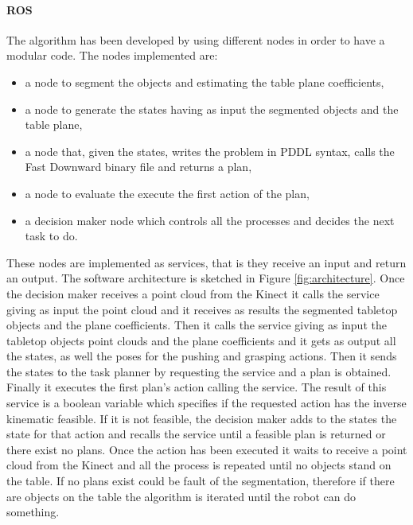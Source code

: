 \paragraph{ROS}
The algorithm has been developed by using different nodes in order to have a modular code. 
The nodes implemented are:
\begin{itemize}
\item a node to segment the objects and estimating the table plane coefficients,
\item a node to generate the states having as input the segmented objects and the table plane,
\item a node that, given the states, writes the problem in PDDL syntax, calls the Fast Downward binary file and returns a plan,
\item a node to evaluate the execute the first action of the plan,
\item a decision maker node which controls all the processes and decides the next task to do.  
\end{itemize}
These nodes are implemented as services, that is they receive an input and return an output.
The software architecture is sketched in Figure \ref{fig:architecture}. 
Once the decision maker receives a point cloud from the Kinect it calls the  service giving as input the point cloud and it receives as results the segmented tabletop objects and the plane coefficients. Then it calls the  service giving as input the tabletop objects point clouds and the plane coefficients and it gets as output all the states, as well the poses for the pushing and grasping actions. Then it sends the states to the task planner by requesting the  service and a plan is obtained. Finally it executes the first plan's action calling the  service. The result of this service is a boolean variable which specifies if the requested action has the inverse kinematic feasible. If it is not feasible, the decision maker adds to the states the  state for that action and recalls the  service until a feasible plan is returned or there exist no plans.
Once the action has been executed it waits to receive a point cloud from the Kinect and all the process is repeated until no objects stand on the table. If no plans exist could be fault of the segmentation, therefore if there are objects on the table the algorithm is iterated until the robot can do something.
